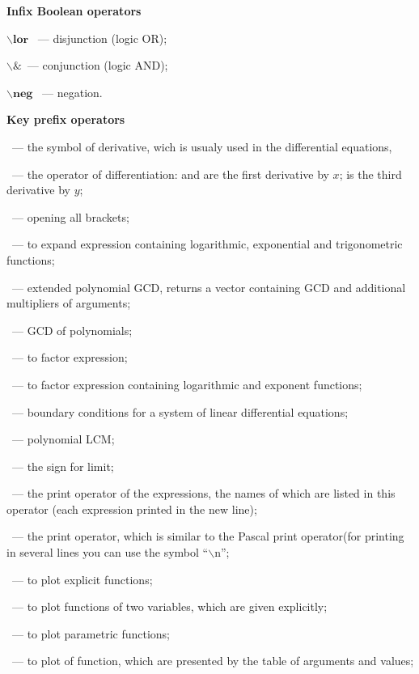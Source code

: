 {\bf Infix Boolean operators}


 $\mathbf{ \backslash lor}$ ~--- disjunction (logic OR); 

 $\mathbf{  \backslash \&}$~--- conjunction (logic AND); 

$\mathbf{ \backslash neg}$ ~--- negation.  


{\bf Key prefix operators}

 ~--- the symbol of derivative, wich is usualy used in the differential equations,

 ~--- the operator of differentiation:  and  are the first derivative by $x$;  is the third derivative by $y$;

 ~--- opening all brackets;

 ~--- to expand expression containing logarithmic, exponential and trigonometric  functions;

 ~--- extended polynomial GCD, returns a vector containing GCD and additional multipliers of arguments;

  ~--- GCD of polynomials; 

 ~--- to factor expression;  

 ~--- to factor expression containing logarithmic and exponent functions;

 ~--- boundary conditions for a system of linear differential equations;

 ~--- polynomial LCM; 

 ~--- the sign for limit; 

 ~--- the print operator of the expressions, the names of which are listed in this operator (each expression printed in the new line);

 ~--- the print operator, which is similar to the Pascal print operator(for printing in several lines you can use the symbol ``$\backslash$n'';
 
 ~--- to plot explicit functions; 
 
  ~--- to plot functions of two variables, which are given explicitly;

 ~--- to plot parametric functions;  

~--- to plot of function, which are presented by the table of arguments and values; 

